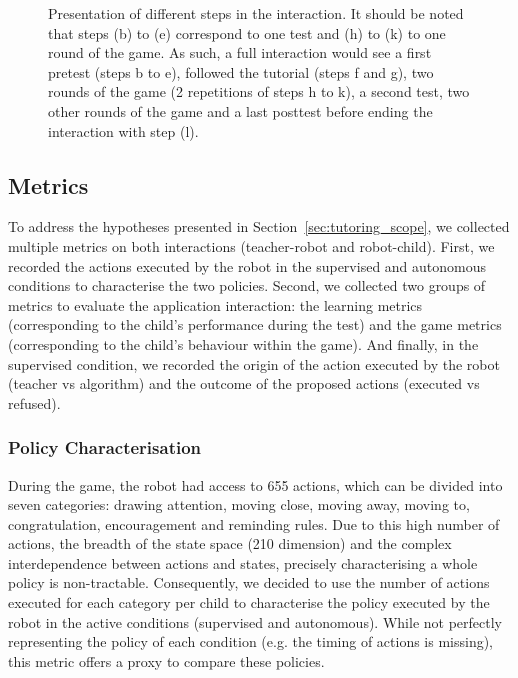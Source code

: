 \begin{figure}[ht]
	\caption{Presentation of different steps in the interaction. It should be noted that steps (b) to (e) correspond to one test and (h) to (k) to one round of the game. As such, a full interaction would see a first pretest (steps b to e), followed the tutorial (steps f and g), two rounds of the game (2 repetitions of steps h to k), a second test, two other rounds of the game and a last posttest before ending the interaction with step (l).}
	\label{fig:tuto_sequence}
\end{figure}

\subsection{Metrics} \label{sec:tuto_metric}

To address the hypotheses presented in Section~\ref{sec:tutoring_scope}, we collected multiple metrics on both interactions (teacher-robot and robot-child). First, we recorded the actions executed by the robot in the supervised and autonomous conditions to characterise the two policies. Second, we collected two groups of metrics to evaluate the application interaction: the learning metrics (corresponding to the child's performance during the test) and the game metrics (corresponding to the child's behaviour within the game). And finally, in the supervised condition, we recorded the origin of the action executed by the robot (teacher vs algorithm) and the outcome of the proposed actions (executed vs refused).

\subsubsection{Policy Characterisation}

During the game, the robot had access to 655 actions, which can be divided into seven categories: drawing attention, moving close, moving away, moving to, congratulation, encouragement and reminding rules. Due to this high number of actions, the breadth of the state space (210 dimension) and the complex interdependence between actions and states, precisely characterising a whole policy is non-tractable. Consequently, we decided to use the number of actions executed for each category per child to characterise the policy executed by the robot in the active conditions (supervised and autonomous). While not perfectly representing the policy of each condition (e.g. the timing of actions is missing), this metric offers a proxy to compare these policies. 

